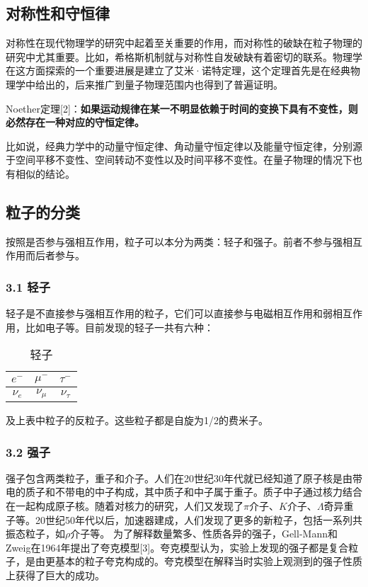 \subsection{ 对称性和守恒律}
对称性在现代物理学的研究中起着至关重要的作用，而对称性的破缺在粒子物理的研究中尤其重要。比如，希格斯机制就与对称性自发破缺有着密切的联系。物理学在这方面探索的一个重要进展是建立了艾米·诺特定理，这个定理首先是在经典物理学中给出的，后来推广到量子物理范围内也得到了普遍证明。

Noether定理[2]：\textbf{如果运动规律在某一不明显依赖于时间的变换下具有不变性，则必然存在一种对应的守恒定律。}

比如说，经典力学中的动量守恒定律、角动量守恒定律以及能量守恒定律，分别源于空间平移不变性、空间转动不变性以及时间平移不变性。在量子物理的情况下也有相似的结论。

\subsection{粒子的分类}
按照是否参与强相互作用，粒子可以本分为两类：轻子和强子。前者不参与强相互作用而后者参与。

\subsubsection{3.1 轻子}
轻子是不直接参与强相互作用的粒子，它们可以直接参与电磁相互作用和弱相互作用，比如电子等。目前发现的轻子一共有六种：
\begin{table}[h!]
\centering
\caption{ 轻子}
\begin{tabular}{|c|c|c|} 
\hline
$e^-$ & $\mu^-$ & $\tau^-$ \\
\hline
$\nu_e$ & $\nu_\mu$ & $\nu_\tau$ \\
\hline
\end{tabular}
\end{table}
及上表中粒子的反粒子。这些粒子都是自旋为1/2的费米子。
\subsubsection{3.2 强子}
强子包含两类粒子，重子和介子。人们在20世纪30年代就已经知道了原子核是由带电的质子和不带电的中子构成，其中质子和中子属于重子。质子中子通过核力结合在一起构成原子核。随着对核力的研究，人们又发现了$\pi$介子、$K$介子、$\Lambda$奇异重子等。20世纪50年代以后，加速器建成，人们发现了更多的新粒子，包括一系列共振态粒子，如$\rho$介子等。
为了解释数量繁多、性质各异的强子，Gell-Mann和Zweig在1964年提出了夸克模型[3]。夸克模型认为，实验上发现的强子都是复合粒子，是由更基本的粒子夸克构成的。夸克模型在解释当时实验上观测到的强子性质上获得了巨大的成功。


